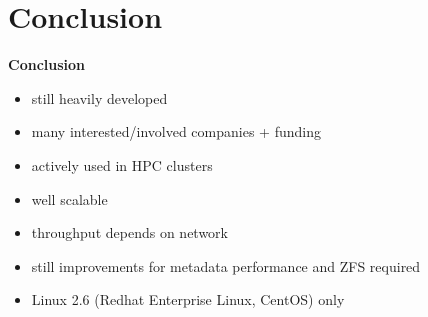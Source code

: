 \section{Conclusion}
\begin{frame}{\textbf{Conclusion}}
    \begin{itemize}
        \item still heavily developed
        \item many interested/involved companies + funding
        \item actively used in HPC clusters
        \item well scalable
        \item throughput depends on network
        \item still improvements for metadata performance and ZFS required
        \item Linux 2.6 (Redhat Enterprise Linux, CentOS) only
    \end{itemize}
\end{frame}
